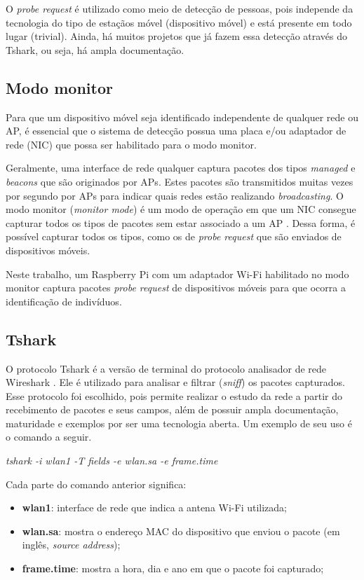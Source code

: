 O \emph{probe request} é utilizado como meio de detecção de pessoas, pois
independe da tecnologia do tipo de estaçãos móvel (dispositivo móvel) e está presente em todo lugar (trivial).
Ainda, há muitos projetos
que já fazem essa detecção através do Tshark, ou seja, há ampla documentação.

\subsection{Modo monitor}
\label{modo-monitor}
Para que um dispositivo móvel seja identificado independente de qualquer rede ou AP, é essencial que o sistema de detecção possua uma placa e/ou adaptador de rede (NIC) que possa ser habilitado para o modo monitor.

Geralmente, uma interface de rede qualquer captura pacotes dos tipos \emph{managed} e \emph{beacons} que são originados por APs. Estes pacotes são transmitidos
muitas vezes por segundo por APs para indicar quais redes estão realizando \emph{broadcasting}. O modo monitor (\emph{monitor mode}) é um modo de operação em que um NIC consegue capturar todos os tipos de pacotes sem estar associado a um AP \cite{Acrylic} \cite{Wireshark2017b}. Dessa forma, é possível capturar todos os tipos, como os de \emph{probe request} que são enviados de dispositivos móveis.

Neste trabalho, um Raspberry Pi com um adaptador Wi-Fi habilitado no modo monitor captura pacotes \emph{probe request} de dispositivos móveis
para que ocorra a identificação de indivíduos.

\subsection{Tshark}
O protocolo Tshark é a versão de terminal do protocolo
analisador de rede Wireshark \cite{Wireshark2017} \cite{Wireshark2017a}. Ele é
utilizado para analisar e filtrar (\emph{sniff}) os
pacotes capturados. Esse protocolo foi
escolhido, pois permite realizar o estudo da rede a partir do recebimento de
pacotes e seus campos, além de possuir ampla documentação, maturidade e exemplos
por ser uma tecnologia aberta. Um exemplo de seu uso é o comando a seguir.

\begin{center}
\emph{tshark -i wlan1 -T fields -e wlan.sa -e frame.time}
\end{center}

Cada parte do comando anterior significa:
\begin{itemize}
  \item \textbf{wlan1}: interface de rede que indica a antena Wi-Fi utilizada;
  \item \textbf{wlan.sa}: mostra o endereço MAC do dispositivo que enviou o pacote (em inglês, \emph{source address});
  \item \textbf{frame.time}: mostra a hora, dia e ano em que o pacote foi capturado;
\end{itemize}

